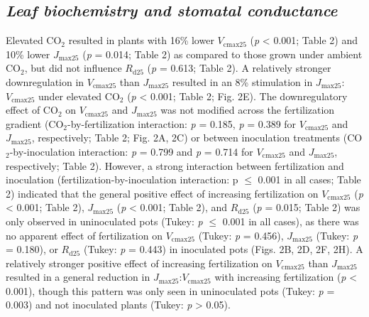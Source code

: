 \subsection{\textit{Leaf biochemistry and stomatal conductance}}
Elevated CO$_2$ resulted in plants with 16\% lower $V_\mathrm{cmax25}$ (\textit{p} < 0.001; Table 2) and 10\% lower $J_\mathrm{max25}$ (\textit{p} = 0.014; Table 2) as compared to those grown under ambient CO$_2$, but did not influence $R_\mathrm{d25}$ (\textit{p} = 0.613; Table 2). A relatively stronger downregulation in $V_\mathrm{cmax25}$ than $J_\mathrm{max25}$ resulted in an 8\% stimulation in $J_\mathrm{max25}$:$V_\mathrm{cmax25}$ under elevated CO$_2$ (\textit{p} < 0.001; Table 2; Fig. 2E). The downregulatory effect of CO$_2$ on $V_\mathrm{cmax25}$ and $J_\mathrm{max25}$ was not modified across the fertilization gradient (CO$_2$-by-fertilization interaction: \textit{p} = 0.185, \textit{p} = 0.389 for $V_\mathrm{cmax25}$ and $J_\mathrm{max25}$, respectively; Table 2; Fig. 2A, 2C) or between inoculation treatments (CO$_2$-by-inoculation interaction: \textit{p} = 0.799 and \textit{p} = 0.714 for $V_\mathrm{cmax25}$ and $J_\mathrm{max25}$, respectively; Table 2). However, a strong interaction between fertilization and inoculation (fertilization-by-inoculation interaction: p $\le$ 0.001 in all cases; Table 2) indicated that the general positive effect of increasing fertilization on $V_\mathrm{cmax25}$ (\textit{p} < 0.001; Table 2), $J_\mathrm{max25}$ (\textit{p} < 0.001; Table 2), and $R_\mathrm{d25}$ (\textit{p} = 0.015; Table 2) was only observed in uninoculated pots (Tukey: \textit{p} $\le$ 0.001 in all cases), as there was no apparent effect of fertilization on $V_\mathrm{cmax25}$ (Tukey: \textit{p} = 0.456), $J_\mathrm{max25}$ (Tukey: \textit{p} = 0.180), or $R_\mathrm{d25}$ (Tukey: \textit{p} = 0.443) in inoculated pots (Figs. 2B, 2D, 2F, 2H). A relatively stronger positive effect of increasing fertilization on $V_\mathrm{cmax25}$ than $J_\mathrm{max25}$ resulted in a general reduction in $J_\mathrm{max25}$:$V_\mathrm{cmax25}$ with increasing fertilization (\textit{p} < 0.001), though this pattern was only seen in uninoculated pots (Tukey: \textit{p} = 0.003) and not inoculated plants (Tukey: \textit{p} > 0.05).

